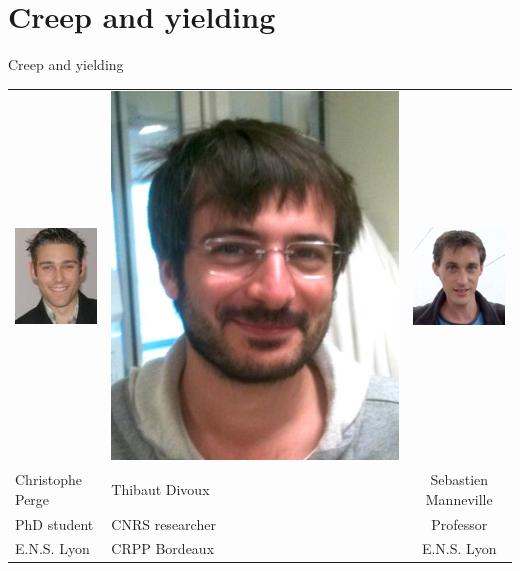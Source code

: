 \documentclass[xcolor=table]{beamer}
\begin{document}
\section*{Creep and yielding}

\begin{frame}{Creep and yielding}

\bigskip
\begin{tabu}{X[c]X[c]c}
\includegraphics[height=0.3\textheight]{Chris}&
\includegraphics[height=0.3\textheight]{Thibaut}&
\includegraphics[height=0.3\textheight]{Seb}\\
Christophe Perge & Thibaut Divoux & Sebastien Manneville\\
PhD student & CNRS researcher & Professor\\
E.N.S. Lyon &  CRPP Bordeaux & E.N.S. Lyon\\
\end{tabu}
\end{frame}
\end{document}
